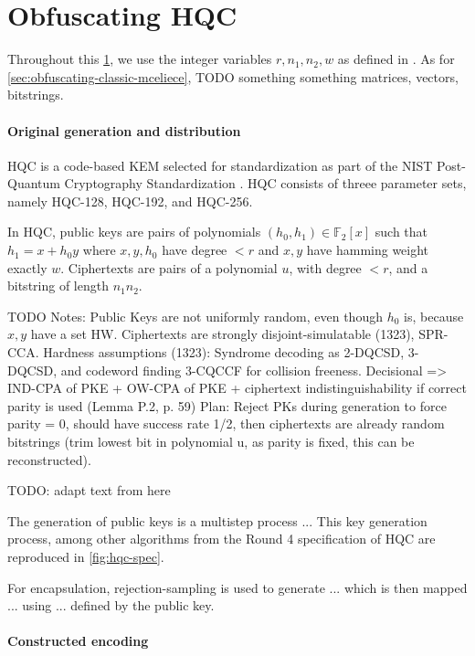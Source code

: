 \section{Obfuscating HQC} \label{sec:obfuscating-hqc}

Throughout this \cref{sec:obfuscating-hqc}, we use the integer variables $r, n_1, n_2, w$ as defined in \cite{NISTPQC-R4:HQC22}.
As for \cref{sec:obfuscating-classic-mceliece}, TODO something something matrices, vectors, bitstrings.

\paragraph{Original generation and distribution}
HQC is a code-based KEM selected for standardization as part of the NIST Post-Quantum Cryptography Standardization \cite{nist-standardization,nist-ir-8545}. HQC consists of threee parameter sets, namely HQC-128, HQC-192, and HQC-256.
 
In HQC, public keys are pairs of polynomials $(h_0, h_1) \in \mathbb{F}_2[x]$ such that $h_1 = x + h_0 y$ where $x,y,h_0$ have degree $<r$ and $x,y$ have hamming weight exactly $w$.
Ciphertexts are pairs of a polynomial $u$, with degree $<r$, and a bitstring of length $n_1n_2$.

TODO Notes:
Public Keys are not uniformly random, even though $h_0$ is, because $x,y$ have a set HW.
Ciphertexts are strongly disjoint-simulatable (1323), SPR-CCA.
Hardness assumptions (1323): Syndrome decoding as 2-DQCSD, 3-DQCSD, and codeword finding 3-CQCCF for collision freeness. Decisional => IND-CPA of PKE + OW-CPA of PKE + ciphertext indistinguishability if correct parity is used (Lemma P.2, p. 59)
Plan: Reject PKs during generation to force parity = 0, should have success rate 1/2, then ciphertexts are already random bitstrings (trim lowest bit in polynomial u, as parity is fixed, this can be reconstructed).

\newpage
TODO: adapt text from here

The generation of public keys is a multistep process ...
This key generation process, among other algorithms from the Round 4 specification of HQC are reproduced in \cref{fig:hqc-spec}.

For encapsulation, rejection-sampling is used to generate ... which is then mapped ... using ... defined by the public key.

\paragraph{Constructed encoding}
